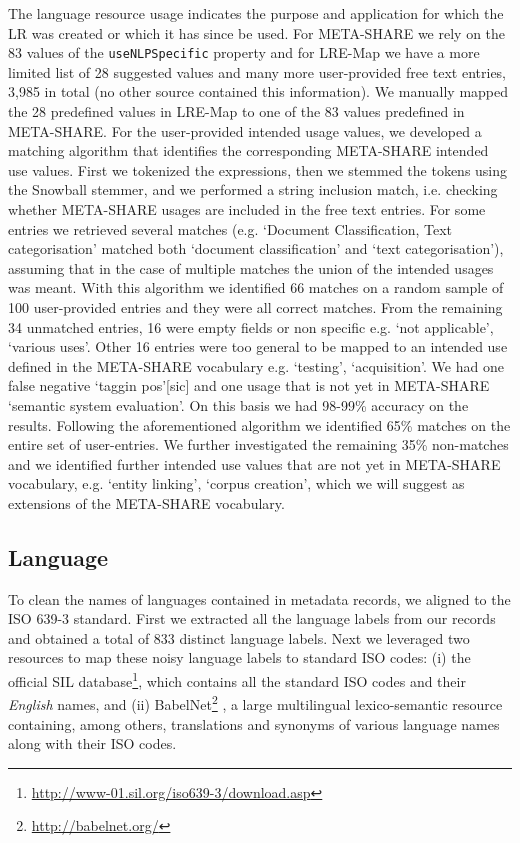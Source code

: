 \documentclass[11pt]{article}
\begin{document}
The language resource usage indicates the purpose and application for which 
the LR was created or which it has since be used. 
For META-SHARE we rely on the 83 values of the 
{\tt useNLPSpecific} property and for LRE-Map we have a more limited list 
of 28 suggested values and many more user-provided free text entries, 3,985 in
total (no other source contained this information). We manually mapped the 28
predefined values in LRE-Map to one of the 83 values predefined in META-SHARE.
For the user-provided intended usage values, we developed a matching algorithm
that identifies the corresponding META-SHARE intended use values. First we
tokenized the expressions, then we stemmed the tokens using the Snowball
stemmer, and we performed a string inclusion match, i.e. checking whether
META-SHARE usages are included in the free text entries. For some entries we
retrieved several matches (e.g.  `Document Classification, Text categorisation'
matched both `document classification' and `text categorisation'), assuming that
in the case of multiple matches the union of the intended usages was meant.
With this algorithm we identified 66 matches on a random sample of 100
user-provided entries and they were all correct matches. From the remaining 34
unmatched entries, 16 were empty fields or non specific e.g.  `not applicable',
`various uses'. Other 16 entries were too general to be mapped to an intended
use defined in the META-SHARE vocabulary e.g. `testing', `acquisition'. We had
one false negative `taggin pos'[sic] and one usage that is not yet in META-SHARE
`semantic system evaluation'. On this basis we had 98-99\% accuracy on the
results.  Following the aforementioned algorithm we identified 65\% matches on
the entire set of user-entries. We further investigated the remaining 35\%
non-matches and we identified further intended use values that are not yet in
META-SHARE vocabulary, e.g.  `entity linking', `corpus creation', which we will
suggest as extensions of the META-SHARE vocabulary.

    
\subsection{Language}

To clean the names of languages contained in metadata records, we aligned
to the ISO 639-3 standard. First we extracted all the language labels
from our records and obtained a total of 833 distinct language labels. Next we
leveraged two resources to map these noisy language labels to standard ISO
codes: (i) the official SIL
database\footnote{\url{http://www-01.sil.org/iso639-3/download.asp}}, which
contains all the standard ISO codes and their \textit{English} names, and (ii)
BabelNet\footnote{\url{http://babelnet.org/}} \cite{NavigliPonzetto:12aij}, a
large multilingual lexico-semantic resource containing, among others,
translations and synonyms of various language names along with their ISO codes. 
\end{document}
